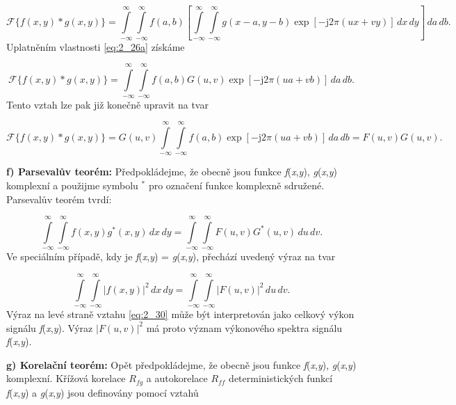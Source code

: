 \begin{equation}
    \mathscr{F}\{ f(x, y) * g(x, y) \} = \int\limits_{-\infty}^{\infty} \int\limits_{-\infty}^{\infty} f(a, b) \left[ \int\limits_{-\infty}^{\infty} \int\limits_{-\infty}^{\infty} g( x - a, y - b) \exp \left[ - \mathrm{j} 2 \pi (ux + vy) \right]\,dx\,dy \right]\,da\,db.\nonumber
\end{equation}
Uplatněním vlastnosti \eqref{eq:2_26a} získáme

\begin{equation}
    \mathscr{F}\{ f(x, y) * g(x, y) \} = \int\limits_{-\infty}^{\infty} \int\limits_{-\infty}^{\infty} f(a, b) G(u, v) \exp \left[ - \mathrm{j} 2 \pi (ua + vb) \right]\,da\,db.\nonumber
\end{equation}
Tento vztah lze pak již konečně upravit na tvar

\begin{equation}
    \mathscr{F}\{ f(x, y) * g(x, y) \} = G(u, v)  \int\limits_{-\infty}^{\infty} \int\limits_{-\infty}^{\infty} f(a, b) \exp \left[ - \mathrm{j} 2 \pi (ua + vb) \right]\,da\,db = F(u, v)G(u, v).\nonumber
\end{equation}

\textbf{f) Parsevalův teorém: }Předpokládejme, že obecně jsou funkce \textit{f}(\textit{x},\textit{y}), \textit{g}(\textit{x},\textit{y}) komplexní a použijme symbolu $^*$ pro označení funkce komplexně sdružené. Parsevalův teorém tvrdí:

\begin{equation} \label{eq:2_29}
    \int\limits_{-\infty}^{\infty} \int\limits_{-\infty}^{\infty} f(x, y) g^*(x, y)\,dx\,dy = \int\limits_{-\infty}^{\infty} \int\limits_{-\infty}^{\infty} F(u, v) G^*(u, v)\,du\,dv.
\end{equation}
Ve speciálním případě, kdy je  \textit{f}(\textit{x},\textit{y}) = \textit{g}(\textit{x},\textit{y}),  přechází uvedený výraz na tvar

\begin{equation} \label{eq:2_30}
    \int\limits_{-\infty}^{\infty} \int\limits_{-\infty}^{\infty} |f(x, y)|^2\,dx\,dy = \int\limits_{-\infty}^{\infty} \int\limits_{-\infty}^{\infty} |F(u, v)|^2 \,du\,dv.
\end{equation}
Výraz na levé straně vztahu \eqref{eq:2_30} může být interpretován jako celkový výkon signálu \textit{f}(\textit{x},\textit{y}). Výraz $|F(u, v)|^2$ má proto význam výkonového spektra signálu \textit{f}(\textit{x},\textit{y}).

\noindent \textbf{g) Korelační teorém:} Opět předpokládejme, že obecně jsou funkce \textit{f}(\textit{x},\textit{y}), \textit{g}(\textit{x},\textit{y}) komplexní. Křížová korelace $R_{fg}$ a autokorelace $R_{ff}$ deterministických funkcí \textit{f}(\textit{x},\textit{y}) a \textit{g}(\textit{x},\textit{y}) jsou definovány pomocí vztahů

